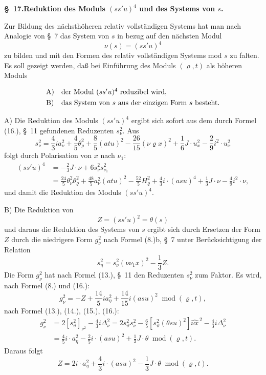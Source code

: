 \documentclass[11pt]{article}
\newcommand{\A}{\Delta}
\newcommand{\modu}[1]{\;\operatorname{mod} #1}
\begin{document}
\begin{center}
\textbf{\S\ 17.\quad Reduktion des Moduls $(ss'u)^4$ und des Systems von $s$.}
\end{center}

Zur Bildung des nächsthöheren relativ vollständigen Systems hat man nach Analogie von \S\ 7 das System von $s$ in bezug auf den nächsten Modul
\[
\nu(s)=(ss'u)^4
\]
zu bilden und mit den Formen des relativ vollständigen Systems mod $s$ zu falten. Es soll gezeigt werden, daß bei Einführung des Moduls $(\varrho,t)$ als höheren Moduls
\[
\begin{array}{ll}
\text{A)}&\text{der Modul }(ss'u)^4\text{ reduzibel wird,}\vphantom{\dfrac11}\\
\text{B)}&\text{das System von }s\text{ aus der einzigen Form }s\text{ besteht.}
\end{array}
\]

A) Die Reduktion des Moduls $(ss'u)^4$ ergibt sich sofort aus dem durch Formel (16.), \S\ 11 gefundenen Reduzenten $s_\nu^2$. Aus
\[
 s_\nu^2=\frac43 i a_\nu^2+\frac45\theta_\varrho^2+\frac85(atu)^2-
 \frac{26}{15}(\nu\varrho x)^2+\frac16J\cdot u_x^2-
 \frac29i^2\cdot u_x^2
\]
folgt durch Polarisation von $x$ nach $\nu_1$:
\[
\tag{21}
\begin{aligned}
(ss'u)^4&=-\frac23J\cdot\nu+6s_\nu^2s_{\nu_1}^2\\
&=\frac{24}{5}\theta_\nu^2\theta_\varrho^2+
\frac{48}{5}a_\nu^2(atu)^2-
\frac{52}{5}H_\varrho^2+
\frac43i\cdot(asu)^4+\frac13J\cdot\nu-
\frac49i^2\cdot\nu,
\end{aligned}
\]
und damit die Reduktion des Moduls $(ss'u)^4$.


B) Die Reduktion von
\[
Z=(ss'u)^2=\theta(s)
\]
und daraus die Reduktion des Systems von $s$ ergibt sich durch Ersetzen der Form $Z$ durch die niedrigere Form $g_\nu^2$ nach Formel (8.)b, \S\ 7 unter Berücksichtigung der Relation
\[
 s_\eta^2=s_\nu^2(\nu\nu_1x)^2-\frac13Z.
\]
Die Form $g_\nu^2$ hat nach Formel (13.), \S\ 11 den Reduzenten $s_\nu^2$ zum Faktor. Es wird, nach Formel (8.) und (16.):
\[
 g_\nu^2=-Z+\frac{14}{5}ia_\eta^2+\frac{14}{15}i(asu)^2
 \modu{(\varrho,t)},
\]
nach Formel (13.), (14.), (15.), (16.):
\[
\begin{aligned}
g_\nu^2&=2[s_\vartheta^2]_{\nu^2}-\frac43 i\A_\nu^2
      =2s_\vartheta^2s_\nu^2-\frac65[s_\vartheta^2(\theta su)^2]\widehat{\nu x}^{\,2}
        -\frac43i\A_\nu^2\\
&=\frac45i\cdot a_\eta^2-\frac25i\cdot(asu)^2+\frac13J\cdot\theta
\modu{(\varrho,t)}.
\end{aligned}
\]
Daraus folgt
\[
\tag{23}
 Z=2i\cdot a_\eta^2+\frac43i\cdot(asu)^2-\frac13J\cdot\theta
 \modu{(\varrho,t)}.
\]
\end{document}
